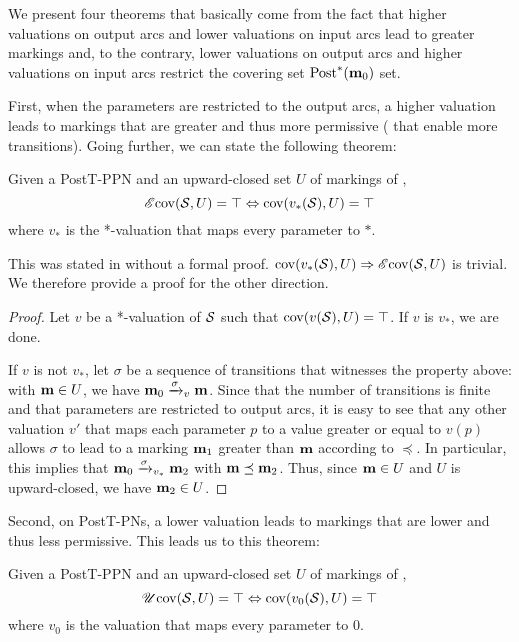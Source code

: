 We present four theorems that basically come from the fact that
higher valuations on output arcs and lower valuations on input arcs lead to greater markings and, to the contrary,
lower valuations on output arcs and higher valuations on input arcs restrict the covering set $\operatorname{Post}^*(\mathbf{m}_0)$ set.

First, when the parameters are restricted to the output arcs, a higher valuation leads to markings that are greater and thus more permissive ( that enable more transitions).
Going further, we can state the following theorem:
\begin{theo}
  \label{theo:post-e-star-val}
  Given a PostT-\ac{PPN} \SPTPm and an upward-closed set $U$ of markings of \PPN, \[\operatorname{\mathscr{E}cov}(\mathcal{S}, U) = \top \Leftrightarrow \operatorname{cov}(v_*(\mathcal{S}), U) = \top\] where $v_*$ is the *-valuation that maps every parameter to $*$.
\end{theo}

This was stated in \cite{David17} without a formal proof.
$\operatorname{cov}(v_*(\mathcal{S}), U) \Rightarrow \operatorname{\mathscr{E}cov}(\mathcal{S}, U)$ is trivial.
We therefore provide a proof for the other direction.


\begin{proof}
  Let $v$ be a *-valuation of $\mathcal{S}$ such that $\operatorname{cov}(v(\mathcal{S}), U) = \top$.
  If $v$ is $v_*$, we are done.

  If $v$ is not $v_*$, let $\sigma$ be a sequence of transitions that witnesses the property above: with $\mathbf{m} \in U$, we have $\mari \fire[\val]{\sigma} \mar$.
  Since that the number of transitions is finite and that parameters are restricted to output arcs, it is easy to see that any other valuation $v'$ that maps each parameter $p$ to a value greater or equal to $v(p)$ allows $\sigma$ to lead to a marking $\mathbf{m}_1$ greater than $\mathbf{m}$ according to $\preceq$.
  In particular, this implies that $\mari \fire[\val_*]{\sigma} \mar_2$ with $\mathbf{m} \preceq \mathbf{m}_2$.
  Thus, since $\mathbf{m} \in U$ and $U$ is upward-closed, we have $\mathbf{m}_2 \in U$.
\end{proof}

Second, on PostT-\acp{PN}, a lower valuation leads to markings that are lower and thus less permissive.
This leads us to this theorem:
\begin{theo}
  \label{theo:post-u-zero-val}
  Given a PostT-\ac{PPN} \SPTPm and an upward-closed set $U$ of markings of \PPN, \[\operatorname{\mathscr{U}cov}(\mathcal{S}, U) = \top \Leftrightarrow \operatorname{cov}(v_0(\mathcal{S}), U) = \top\] where $v_0$ is the valuation that maps every parameter to $0$.
\end{theo}

